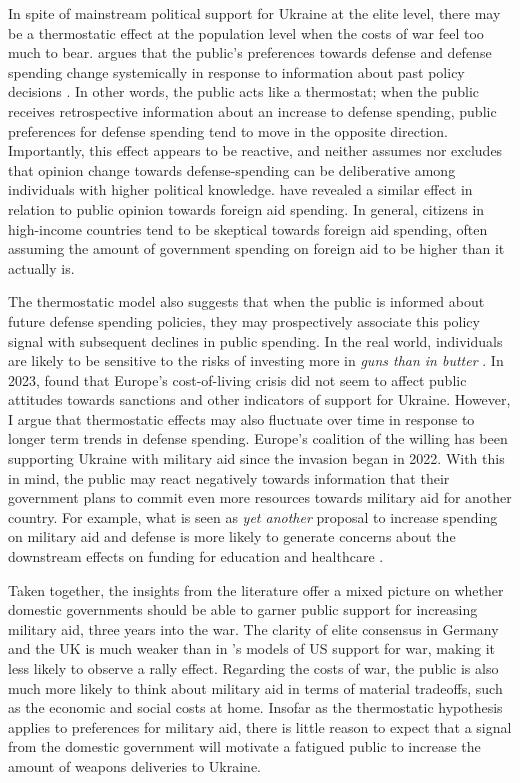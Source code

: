 In spite of mainstream political support for Ukraine at the elite level, there may be a thermostatic effect at the population level when the costs of war feel too much to bear. \textcite{wlezien_public_1995} argues that the public's preferences towards defense and defense spending change systemically in response to information about past policy decisions \autocite{wlezien_public_1995}. In other words, the public acts like a thermostat; when the public receives retrospective information about an increase to defense spending, public preferences for defense spending tend to move in the opposite direction. Importantly, this effect appears to be reactive, and neither assumes nor excludes that opinion change towards defense-spending can be deliberative among individuals with higher political knowledge. \textcite{scotto_we_2017} have revealed a similar effect in relation to public opinion towards foreign aid spending. In general, citizens in high-income countries tend to be skeptical towards foreign aid spending, often assuming the amount of government spending on foreign aid to be higher than it actually is.

The thermostatic model also suggests that when the public is informed about future defense spending policies, they may prospectively associate this policy signal with subsequent declines in public spending. In the real world, individuals are likely to be sensitive to the risks of investing more in \emph{guns than in butter} \autocite{powell_guns_1993, bove_political_2016, carrubba_decision_2004}. In 2023, \textcite{thomson_european_2023} found that Europe's cost-of-living crisis did not seem to affect public attitudes towards sanctions and other indicators of support for Ukraine. However, I argue that thermostatic effects may also fluctuate over time in response to longer term trends in defense spending. Europe's coalition of the willing has been supporting Ukraine with military aid since the invasion began in 2022. With this in mind, the public may react negatively towards information that their government plans to commit even more resources towards military aid for another country. For example, what is seen as \textit{yet another} proposal to increase spending on military aid and defense is more likely to generate concerns about the downstream effects on funding for education and healthcare \autocite{mintz_electoral_1988}. 

Taken together, the insights from the literature offer a mixed picture on whether domestic governments should be able to garner public support for increasing military aid, three years into the war. The clarity of elite consensus in Germany and the UK is much weaker than in \textcite{berinsky_assuming_2007}'s models of US support for war, making it less likely to observe a rally effect. Regarding the costs of war, the public is also much more likely to think about military aid in terms of material tradeoffs, such as the economic and social costs at home. Insofar as the thermostatic hypothesis applies to preferences for military aid, there is little reason to expect that a signal from the domestic government will motivate a fatigued public to increase the amount of weapons deliveries to Ukraine. 

